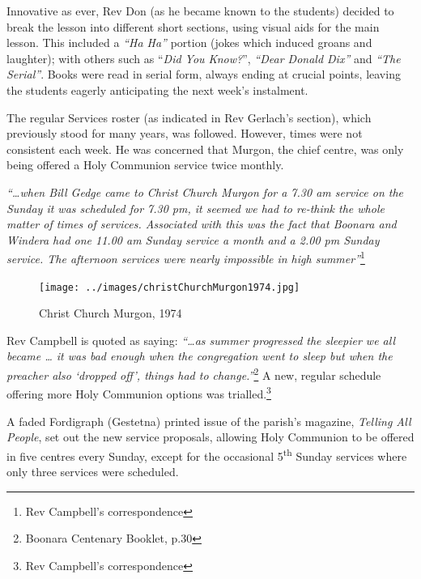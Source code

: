 Innovative as ever, Rev Don (as he became known to the students) decided to break the lesson into different short sections, using visual aids for the main lesson. This included a \emph{``Ha Ha''} portion (jokes which induced groans and laughter); with others such as ``\emph{Did You Know?}'', \emph{``Dear Donald Dix''} and \emph{``The Serial''}. Books were read in serial form, always ending at crucial points, leaving the students eagerly anticipating the next week's instalment.



The regular Services roster (as indicated in Rev Gerlach's section), which previously stood for many years, was followed. However, times were not consistent each week. He was concerned that Murgon, the chief centre, was only being offered a Holy Communion service twice monthly.



\emph{``\ldots when Bill Gedge came to Christ Church Murgon for a 7.30 am service on the Sunday it was scheduled for 7.30 pm, it seemed we had to re-think the whole matter of times of services. Associated with this was the fact that Boonara and Windera had one 11.00 am Sunday service a month and a 2.00 pm Sunday service. The afternoon services were nearly impossible in high summer''}\footnote{Rev Campbell's correspondence}








\begin{figure}
\begin{center}
\texttt{[image: ../images/christChurchMurgon1974.jpg]}
\caption{Christ Church Murgon, 1974}
\end{center}
\end{figure}




Rev Campbell is quoted as saying: \emph{``\ldots as summer progressed the sleepier we all became \ldots{} it was bad enough when the congregation went to sleep but when the preacher also `dropped off', things had to change.''}\footnote{Boonara Centenary Booklet, p.30} A new, regular schedule offering more Holy Communion options was trialled.\footnote{Rev Campbell's correspondence}


A faded Fordigraph (Gestetna) printed issue of the parish's magazine, \emph{Telling All People}, set out the new service proposals, allowing Holy Communion to be offered in five centres every Sunday, except for the occasional 5\textsuperscript{th} Sunday services where only three services were scheduled.



